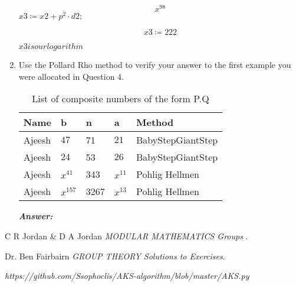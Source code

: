 \documentclass[11pt,a4paper,fleqn]{article}
\begin{document}
\begin{enumerate}[1.]
\begin{flushleft}
\begin{mdframed}
			\begin{dmath}\label{(13)}
				x^{98}
			\end{dmath}
			\mapleinput
			{$ \displaystyle \mathit{x3} \coloneqq \mathit{x2} +p^{2}\cdot \mathit{d2} ; $}
			
			\begin{dmath}\label{(14)}
				\mathit{x3} \coloneqq 222
			\end{dmath}
			\begin{Maple Normal}
				{$ \displaystyle \mathit{x3} \mathit{is} \mathit{our} \mathit{logarithm}  $}
			\end{Maple Normal}
			\end{mdframed}	
		\end{flushleft}
		\item Use the Pollard Rho method to verify your answer to the first example you were allocated in Question 4. 
		
		\begin{table}[H]
			\begin{adjustbox}{scale=0.9,center}
				\begin{tabular}{ |p{2cm}|p{2cm}|p{2cm}|p{2cm}|p{4cm}| }
					\hline
					Name & b & n & a & Method \\
					\hline
					Ajeesh & $47$   & 71   & $21$   & BabyStepGiantStep \\
					Ajeesh & $24$   & 53   & $26$   & BabyStepGiantStep  \\
					Ajeesh & $x^{41}$ & 343  & $x^{11}$ & Pohlig Hellmen \\
					Ajeesh & $x^{157}$& 3267 & $x^{13}$ & Pohlig Hellmen  \\
					\hline
				\end{tabular}
			\end{adjustbox}
			\caption{List of composite numbers of the form P.Q}
			\label{table:composite-pq}
		\end{table}
		
		\begin{flushleft}
			\textbf{\textit{Answer:}}
		\end{flushleft}
	\end{enumerate}
	
	\begin{thebibliography}{unsrt}
		
		C R Jordan \& D A Jordan \emph{MODULAR MATHEMATICS Groups }.
		
		Dr. Ben Fairbairn \emph{GROUP THEORY Solutions to Exercises}.
		
		\emph{https://github.com/Ssophoclis/AKS-algorithm/blob/master/AKS.py}
		
	\end{thebibliography}
	
\end{document}
